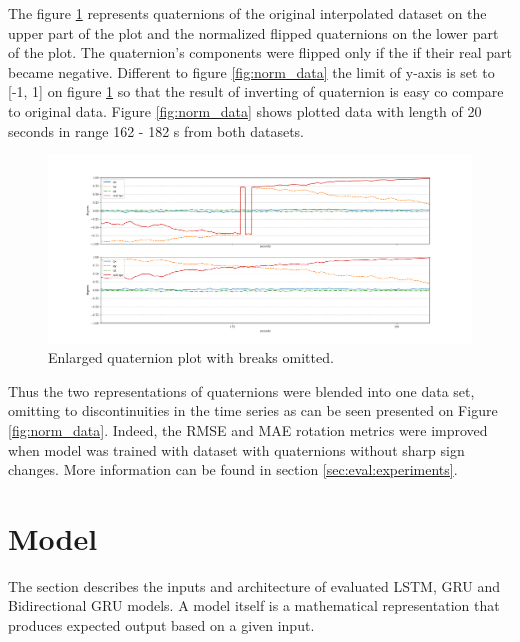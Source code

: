  The figure \ref{fig:compare} represents quaternions of the original interpolated dataset on the upper part of the plot and the normalized flipped quaternions on the lower part of the plot. The quaternion's components were flipped only if the if their real part became negative. Different to figure \ref{fig:norm_data} the limit of y-axis is set to [-1, 1] on figure \ref{fig:compare} so that the result of inverting of quaternion is easy co compare to original data. Figure \ref{fig:norm_data} shows plotted data with length of 20 seconds in range 162 - 182 s from both datasets.
\begin{figure}[htb]
	\begin{center}
		\includegraphics[width=1\textwidth, keepaspectratio]{gfx/Fig-1556-compare.pdf}
		\caption{\label{fig:compare} Enlarged quaternion plot with breaks omitted.}
	\end{center}
\end{figure}

Thus the two representations of quaternions were blended into one data set, omitting to discontinuities in the time series as can be seen presented on Figure \ref{fig:norm_data}. Indeed, the RMSE and MAE rotation metrics were improved when model was trained with dataset with quaternions without sharp sign changes. More information can be found in section \ref{sec:eval:experiments}.

\newpage
\section{Model}
\label{sec:impl:model}
The section describes the inputs and architecture of evaluated LSTM, GRU and Bidirectional GRU models. A model itself is a mathematical representation that produces expected output based on a given input. 
